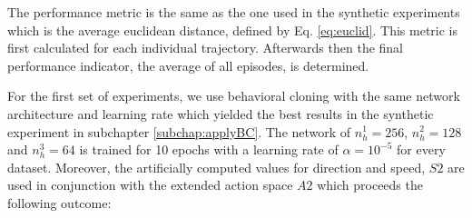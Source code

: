 The performance metric is the same as the one used in the synthetic experiments which is the average euclidean distance, defined by Eq.  \ref{eq:euclid}. This metric is first calculated for each individual trajectory. Afterwards then the final performance indicator, the average of all episodes, is determined.
\par
For the first set of experiments, we use behavioral cloning with the same network architecture and learning rate which yielded the best results in the synthetic experiment in subchapter \ref{subchap:applyBC}. The network of $n_h^1=256$, $n_h^2=128$ and $n_h^3=64$ is trained for 10 epochs with a learning rate of $\alpha=10^{-5}$ for every dataset. Moreover, the artificially computed values for direction and speed, $S2$ are used in conjunction with the extended action space $A2$ which proceeds the following outcome:

